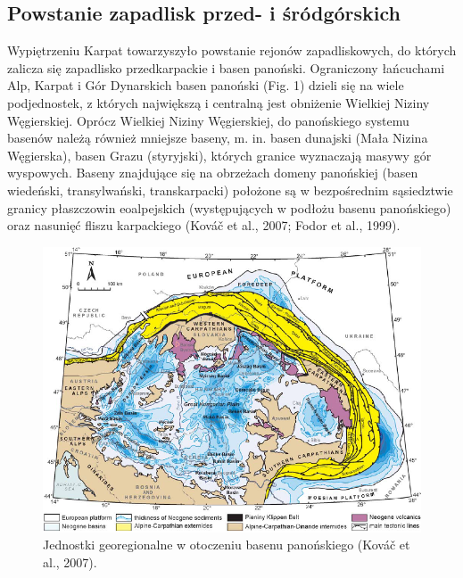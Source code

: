 \documentclass[11.5pt,twoside]{report}
\begin{document}

  

	
	\subsection{Powstanie zapadlisk przed- i śródgórskich}
	
Wypiętrzeniu Karpat towarzyszyło powstanie rejonów zapadliskowych, do których zalicza się zapadlisko przedkarpackie i basen panoński. Ograniczony łańcuchami Alp, Karpat i Gór Dynarskich basen panoński (Fig. 1) dzieli się na wiele podjednostek, z których największą i centralną jest obniżenie Wielkiej Niziny Węgierskiej. Oprócz Wielkiej Niziny Węgierskiej, do panońskiego systemu basenów należą również mniejsze baseny, m. in. basen dunajski (Mała Nizina Węgierska), basen Grazu (styryjski), których granice wyznaczają masywy gór wyspowych. Baseny znajdujące się na obrzeżach domeny panońskiej (basen wiedeński, transylwański, transkarpacki) położone są w bezpośrednim sąsiedztwie granicy płaszczowin eoalpejskich (występujących w podłożu basenu panońskiego) oraz nasunięć fliszu karpackiego (Kováč et al., 2007; Fodor et al., 1999).

\begin{figure}[h]
	\centering
	\includegraphics[scale=0.7]{"../Termika/kovac et al"}
	\caption{Jednostki georegionalne w otoczeniu basenu panońskiego (Kováč et al., 2007).}
	\label{Fig.}
\end{figure}
\end{document}
